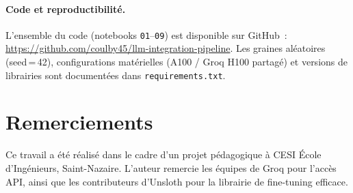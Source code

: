 \documentclass[10pt,journal,compsoc]{IEEEtran}
\begin{document}
\paragraph{Code et reproductibilité.}
L'ensemble du code (notebooks \texttt{01}--\texttt{09}) est disponible
sur GitHub~: \url{https://github.com/coulby45/llm-integration-pipeline}.
Les graines aléatoires (seed\,=\,42), configurations matérielles
(A100 / Groq H100 partagé) et versions de librairies sont documentées
dans \texttt{requirements.txt}.


\section*{Remerciements}

Ce travail a été réalisé dans le cadre d'un projet pédagogique à
CESI École d'Ingénieurs, Saint-Nazaire. L'auteur remercie les équipes
de Groq pour l'accès API, ainsi que les contributeurs d'Unsloth pour
la librairie de fine-tuning efficace.
\end{document}

